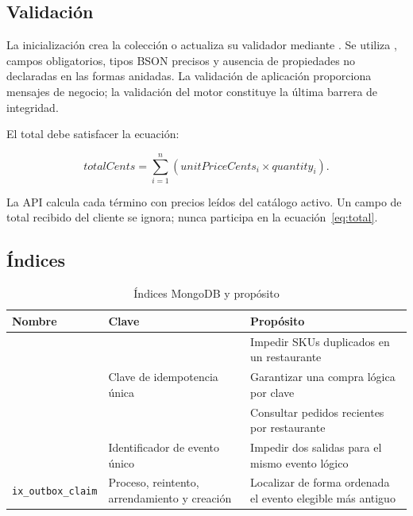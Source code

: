 \subsection{Validación}

La inicialización crea la colección o actualiza su validador mediante . Se utiliza , campos obligatorios, tipos BSON precisos y ausencia de propiedades no declaradas en las formas anidadas. La validación de aplicación proporciona mensajes de negocio; la validación del motor constituye la última barrera de integridad.

El total debe satisfacer la ecuación:

\begin{equation}
  \textit{totalCents} = \sum_{i=1}^{n}
  \left(\textit{unitPriceCents}_{i} \times \textit{quantity}_{i}\right).
  \label{eq:total}
\end{equation}

La API calcula cada término con precios leídos del catálogo activo. Un campo de total recibido del cliente se ignora; nunca participa en la ecuación~\ref{eq:total}.

\subsection{Índices}

\begin{table}[H]
  \centering
  \caption{Índices MongoDB y propósito}
  \label{tab:indices}
  \begin{tabularx}{\textwidth}{@{}p{4cm}p{4.2cm}Y@{}}
    \toprule
    \textbf{Nombre} & \textbf{Clave} & \textbf{Propósito} \\
    \midrule
     &  & Impedir SKUs duplicados en un restaurante \\
     & Clave de idempotencia única & Garantizar una compra lógica por clave \\
     &  & Consultar pedidos recientes por restaurante \\
     & Identificador de evento único & Impedir dos salidas para el mismo evento lógico \\
    \nolinkurl{ix_outbox_claim} & Proceso, reintento, arrendamiento y creación & Localizar de forma ordenada el evento elegible más antiguo \\
    \bottomrule
  \end{tabularx}
\end{table}

